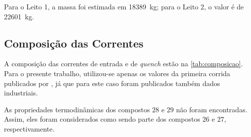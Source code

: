 
Para o Leito 1, a massa foi estimada em \SI{18389}{kg}; para o Leito 2, o valor
é de \SI{22601}{kg}.

\subsection{Composição das Correntes} \label{sec:composicaocorrentes}

A composição das correntes de entrada e de \emph{quench} estão na
\autoref{tab:composicao}. Para o presente trabalho, utilizou-se
apenas os valores da primeira corrida publicados por , já
que para este caso foram publicados também dados industriais.

As propriedades termodinâmicas dos compostos $28$ e $29$ não foram
encontradas. Assim, eles foram considerados como sendo parte dos compostos
$26$ e $27$, respectivamente.

